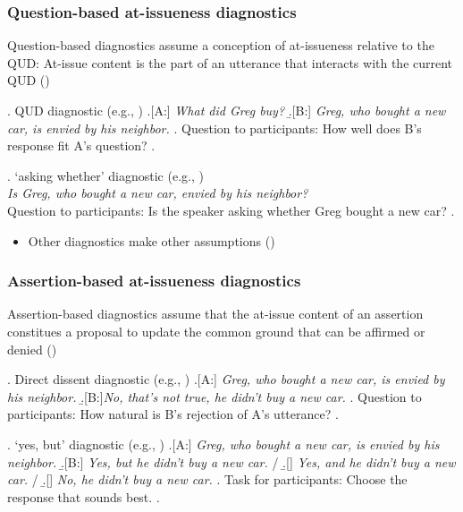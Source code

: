 \documentclass[compress, xcolor = dvipsnames, aspectratio=169, handout]{beamer}
\begin{document}
	\begin{frame}[t]\frametitle{Question-based at-issueness diagnostics}\small

		Question-based diagnostics assume a conception of at-issueness relative to the QUD: At-issue content is the part of an utterance that interacts with the current QUD (\citealt{amaral_review_2007,simons_what_2010})\pause

		\ex. \label{qud}%
		    QUD diagnostic (e.g., \citealt{tonhauser_diagnosing_2012,chen_presuppositions_2024})
		    \a.[A:] \emph{What did Greg buy?}
		    \b.[B:] \emph{Greg, who bought a new car, is envied by his neighbor.}
		    \z.
		    Question to participants: How well does B's response fit A's question?\pause
		\z.	

		\ex. \label{aw}%
		    `asking whether' diagnostic (e.g., \citealt{tonhauser_how_2018,solstad_cataphoric_2024})\smallskip\\
		      \emph{Is Greg, who bought a new car, envied by his neighbor?}\smallskip
		  \\ Question to participants: Is the speaker asking whether Greg bought a new car?\pause
		  \z.

		\begin{itemize}
			\item Other diagnostics make other assumptions
			(\citealt{snider_anaphoric_2017,snider_at-issuenessne_2017,snider_distinguishing_2018,koev_notions_2018,faller_discourse_2019,korotkova_evidential_2020})
		\end{itemize}
	
	\end{frame}

	\begin{frame}[t]\frametitle{Assertion-based at-issueness diagnostics}\small
		Assertion-based diagnostics assume that the at-issue content of an assertion constitues a proposal to update the common ground that can be affirmed or denied (\citealt{farkas_reacting_2010,murray_varieties_2014,anderbois_at-issue_2015})\pause

		  \ex. \label{dd} Direct dissent diagnostic (e.g., \citealt{tonhauser_diagnosing_2012,syrett_experimental_2015})
		    \a.[A:] \emph{Greg, who bought a new car, is envied by his neighbor.}
		    \b.[B:]\emph{No, that's not true, he didn't buy a new car.}
		    \z.
		  Question to participants: How natural is B's rejection of A's utterance?\pause
		  \z.

		  \ex. \label{yesbut}%
		    `yes, but' diagnostic (e.g., \citealt{xue_correlation_2011,destruel_cross-linguistic_2015})
		    \a.[A:] \emph{Greg, who bought a new car, is envied by his neighbor.}
		    \b.[B:] \emph{Yes, but he didn't buy a new car.} /
		    \b.[] \emph{Yes, and he didn't buy a new car.} /
		    \b.[] \emph{No, he didn't buy a new car.}
		    \z.
		    Task for participants: Choose the response that sounds best.
		  \z.
	
	\end{frame}
\end{document}
